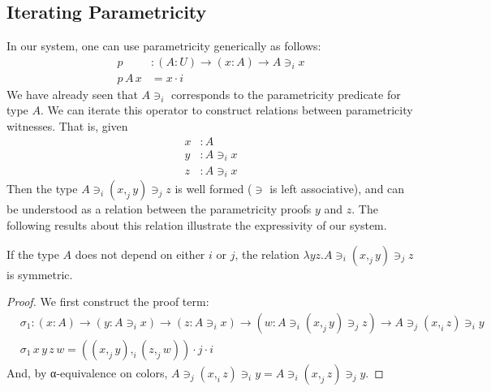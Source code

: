 \documentclass[english]{PaperTools/latex/lipics}
\newcommand\CP[3]{(#2,_{#1} #3)}
\newcommand\param[1]{\!\cdot\!#1}
\newcommand\op[1]{∋_{#1}}
\begin{document}
\subsection{Iterating Parametricity}
In our system, one can use parametricity generically as follows:
\begin{align*}
p &: (A:U) → (x:A) → A \op i x\\
p\, A\, x &= x\param i
\end{align*}
We have already seen that $A \op i $ corresponds to the parametricity
predicate for type $A$. We can iterate this operator to construct
relations between parametricity witnesses. That is, given
\begin{align*}
  x & :A \\
  y & : A \op i x\\
  z & : A \op i x
\end{align*}
Then the type $A \op i \CP j x y \op j z$ is well formed ($∋$ is left
associative), and can be understood as a relation
between the parametricity proofs $y$ and $z$. The following results about this relation illustrate the expressivity of our system.
\begin{theorem}
If the type $A$ does not depend on either $i$ or $j$, the relation $λy z. A \op i \CP j x y \op j z$ is symmetric.
\end{theorem}
\begin{proof}
  We first construct the proof term:
  \begin{align*}
    &\sigma_1 : (x:A) → (y : A \op i x) → (z : A \op i x) → (w : A \op i \CP j x y \op j z) → A \op j \CP i x z \op i y \\
    &\sigma_1\, x\, y\, z\, w = \CP i {\CP j x y}{\CP j z w} \param j \param i
  \end{align*}
  And, by α-equivalence on colors, $A \op j \CP i x z \op i y = A \op i \CP j x z \op j y$.
\end{proof}
\end{document}
